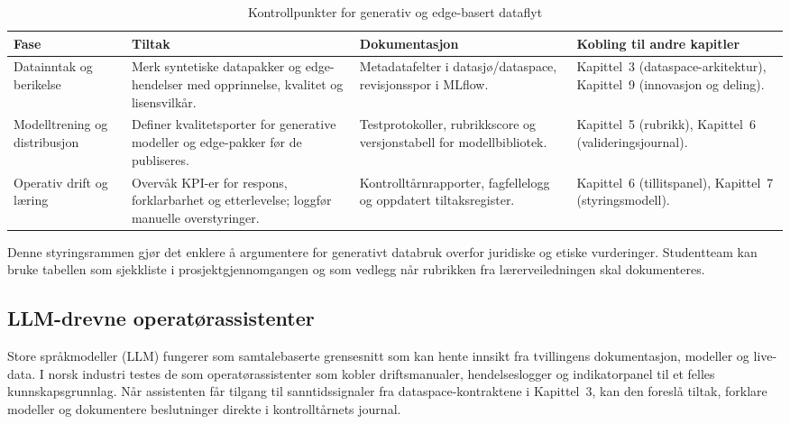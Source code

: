 \begin{table}[htbp]
    \centering
    \caption{Kontrollpunkter for generativ og edge-basert dataflyt}
    \label{tab:kontrollpunkter-generativ}
    \begin{tabular}{p{3.6cm}p{4.0cm}p{4.2cm}p{3.8cm}}
        \toprule
        \textbf{Fase} & \textbf{Tiltak} & \textbf{Dokumentasjon} & \textbf{Kobling til andre kapitler} \\
        \midrule
        Datainntak og berikelse & Merk syntetiske datapakker og edge-hendelser med opprinnelse, kvalitet og lisensvilkår. & Metadatafelter i datasjø/dataspace, revisjonsspor i MLflow. & Kapittel~3 (dataspace-arkitektur), Kapittel~9 (innovasjon og deling). \\
        \addlinespace
        Modelltrening og distribusjon & Definer kvalitetsporter for generative modeller og edge-pakker før de publiseres. & Testprotokoller, rubrikkscore og versjonstabell for modellbibliotek. & Kapittel~5 (rubrikk), Kapittel~6 (valideringsjournal). \\
        \addlinespace
        Operativ drift og læring & Overvåk KPI-er for respons, forklarbarhet og etterlevelse; loggfør manuelle overstyringer. & Kontrolltårnrapporter, fagfellelogg og oppdatert tiltaksregister. & Kapittel~6 (tillitspanel), Kapittel~7 (styringsmodell). \\
        \bottomrule
    \end{tabular}
\end{table}

Denne styringsrammen gjør det enklere å argumentere for generativt databruk overfor juridiske og etiske vurderinger. Studentteam kan bruke tabellen som sjekkliste i prosjektgjennomgangen og som vedlegg når rubrikken fra lærerveiledningen skal dokumenteres.

\subsection{LLM-drevne operatørassistenter}
Store språkmodeller (LLM) fungerer som samtalebaserte grensesnitt som kan hente innsikt fra tvillingens dokumentasjon, modeller og live-data.\citep{openai2024gpt4o} I norsk industri testes de som operatørassistenter som kobler driftsmanualer, hendelseslogger og indikatorpanel til et felles kunnskapsgrunnlag. Når assistenten får tilgang til sanntidssignaler fra dataspace-kontraktene i Kapittel~3, kan den foreslå tiltak, forklare modeller og dokumentere beslutninger direkte i kontrolltårnets journal.

